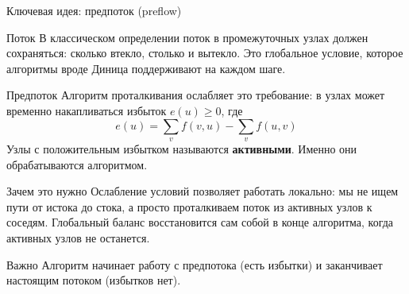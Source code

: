 \documentclass[14pt, aspectratio=169]{beamer}
\begin{document}
\begin{frame}{Ключевая идея: предпоток (preflow)}
\scriptsize
\begin{block}{Поток}
В классическом определении поток в промежуточных узлах должен сохраняться: сколько втекло, столько и вытекло. Это глобальное условие, которое алгоритмы вроде Диница поддерживают на каждом шаге.
\end{block}

\begin{block}{Предпоток}
Алгоритм проталкивания ослабляет это требование: в узлах может временно накапливаться избыток $e(u) \ge 0$, где
\[
e(u) = \sum_{v} f(v, u) - \sum_{v} f(u, v)
\]
Узлы с положительным избытком называются \textbf{активными}. Именно они обрабатываются алгоритмом.
\end{block}

\begin{block}{Зачем это нужно}
Ослабление условий позволяет работать локально: мы не ищем пути от истока до стока, а просто проталкиваем поток из активных узлов к соседям. Глобальный баланс восстановится сам собой в конце алгоритма, когда активных узлов не останется.
\end{block}

\begin{alertblock}{Важно}
Алгоритм начинает работу с предпотока (есть избытки) и заканчивает настоящим потоком (избытков нет).
\end{alertblock}
\end{frame}
\end{document}
